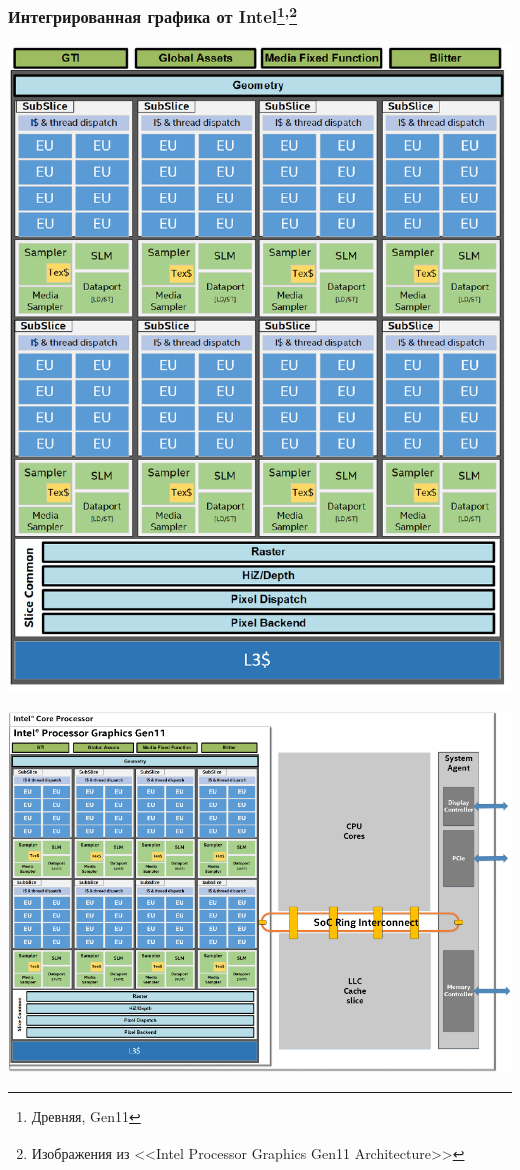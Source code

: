 \documentclass[xcolor=table,aspectratio=169]{beamer}
\begin{document}
\begin{frame}[fragile]
  \frametitle{Интегрированная графика от Intel\footnote{Древняя, Gen11}\textsuperscript{,}\footnote{Изображения из <<Intel\textsuperscript{\textregistered} Processor Graphics Gen11
  Architecture>>}}
  \begin{minipage}[t]{0.32\textwidth}
  \includegraphics[valign=t,width=\textwidth]{pictures/intel_gpu_crp.pdf}
  \end{minipage}
  \begin{minipage}[t]{0.27\textwidth}
  \includegraphics[valign=t,width=\textwidth]{pictures/intel_gpu_and_cpu_crp.pdf}

\end{minipage}
\end{frame}
\end{document}
